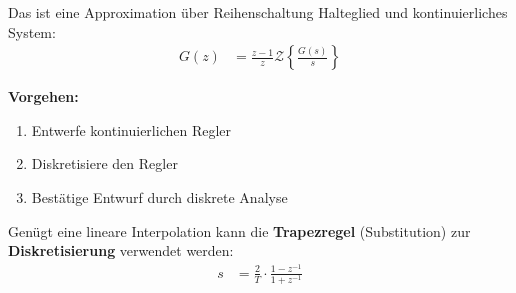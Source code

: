 \begin{tcolorbox}[colback=white!10!white,
                  colframe=blue!30!black,
                  title=$z$-Übertragungsfunktion: Halteglied und kontinuierliches System in Reihe]
    Das ist eine Approximation über Reihenschaltung Halteglied und kontinuierliches System:
    \begin{align*}
        G(z) &= \frac{z-1}{z}\mathcal{Z}\left\{\frac{G(s)}{s}\right\}
    \end{align*}
\end{tcolorbox}

\begin{tcolorbox}[colback=white!10!white,
                  colframe=blue!30!black,
                  title=Reglerentwurf - diskrete Äquivalente]
    \textbf{Vorgehen:}
    \begin{enumerate}
        \item Entwerfe kontinuierlichen Regler
        \item Diskretisiere den Regler
        \item Bestätige Entwurf durch diskrete Analyse
    \end{enumerate}
    Genügt eine lineare Interpolation kann die \textbf{Trapezregel} 
    (Substitution) zur \textbf{Diskretisierung} verwendet werden:
    \begin{align*}
        s &= \frac{2}{T} \cdot \frac{1-z^{-1}}{1+z^{-1}}
    \end{align*}
\end{tcolorbox}